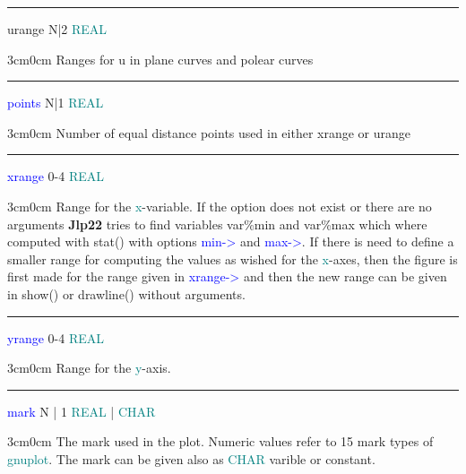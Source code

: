 \vspace{0.3cm} 
\hrule 
\vspace{0.3cm} 
\noindent urange  \tabto{3cm} N|2 \tabto{5cm}   \textcolor{teal}{REAL} \tabto{7cm} 
\begin{changemargin}{3cm}{0cm} 
\noindent  Ranges for u in plane curves and polear curves 
\end{changemargin} 
\vspace{0.3cm} 
\hrule 
\vspace{0.3cm} 
\noindent \textcolor{blue}{points} \tabto{3cm} N|1 \tabto{5cm}  \textcolor{teal}{REAL} \tabto{7cm} 
\begin{changemargin}{3cm}{0cm} 
\noindent Number of equal distance points used in either xrange or urange 
 
\end{changemargin} 
\vspace{0.3cm} 
\hrule 
\vspace{0.3cm} 
\noindent \textcolor{blue}{xrange} \tabto{3cm} 0-4 \tabto{5cm}  \textcolor{teal}{REAL} \tabto{7cm} 
\begin{changemargin}{3cm}{0cm} 
\noindent  Range for the \textcolor{teal}{x}-variable. If the option does not exist or there are no arguments \textbf{Jlp22} tries to 
find variables var\%min and var\%max which where computed with \textcolor{VioletRed}{stat}() with options \textcolor{blue}{min->} 
and \textcolor{blue}{max->}. If there is need to define a smaller range for computing the values as wished 
for the \textcolor{teal}{x}-axes, then the figure is first made for the range given in \textcolor{blue}{xrange->} and then the new 
range can be given in \textcolor{VioletRed}{show}() or \textcolor{VioletRed}{drawline}() without arguments. 
\end{changemargin} 
\vspace{0.3cm} 
\hrule 
\vspace{0.3cm} 
\noindent \textcolor{blue}{yrange} \tabto{3cm} 0-4 \tabto{5cm}  \textcolor{teal}{REAL} \tabto{7cm} 
\begin{changemargin}{3cm}{0cm} 
\noindent  Range for the \textcolor{teal}{y}-axis. 
\end{changemargin} 
\vspace{0.3cm} 
\hrule 
\vspace{0.3cm} 
\noindent \textcolor{blue}{mark}  \tabto{3cm}  N | 1  \tabto{5cm}   \textcolor{teal}{REAL} | \textcolor{teal}{CHAR}  \tabto{7cm} 
\begin{changemargin}{3cm}{0cm} 
\noindent  The mark used in the plot. 
Numeric values refer to 15 
mark types of \textcolor{teal}{gnuplot}. The mark can be given also as \textcolor{teal}{CHAR} varible or constant. 
\end{changemargin} 

